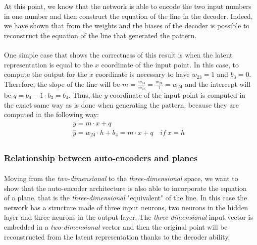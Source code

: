 At this point, we know that the network is able to encode the two input numbers in one number and then construct the equation of the line in the decoder. Indeed, we have shown that from the weights and the biases of the decoder is possible to reconstruct the equation of the line that generated the pattern.

\paragraph{}
One simple case that shows the correctness of this result is when the latent representation is equal to the $x$ coordinate of the input point. \newline
In this case, to compute the output for the $x$ coordinate is necessary to have $w_{23} = 1$ and $b_3 = 0$. Therefore, the slope of the line will be $m = \frac{w_{24}}{w_{23}} = \frac{w_{24}}{1} = w_{24}$ and the intercept will be $q = b_4 - 1 \cdot b_3 = b_4$. \newline
Thus, the $y$ coordinate of the input point is computed in the exact same way as is done when generating the pattern, because they are computed in the following way:
\begin{equation}
    \begin{gathered}
        y = m \cdot x + q \\
        \hat{y} = w_{24} \cdot h + b_4 = m \cdot x + q \quad if\ x = h\\
    \end{gathered}
\end{equation}

\subsubsection{Relationship between auto-encoders and planes}
\label{subsec:ae-planes}
\paragraph{}
Moving from the \textit{two-dimensional} to the \textit{three-dimensional} space, we want to show that the auto-encoder architecture is also able to incorporate the equation of a plane, that is the \textit{three-dimensional} "equivalent" of the line. \newline
In this case the network has a structure made of three input neurons, two neurons in the hidden layer and three neurons in the output layer. The \textit{three-dimensional} input vector is embedded in a \textit{two-dimensional} vector and then the original point will be reconstructed from the latent representation thanks to the decoder ability.


